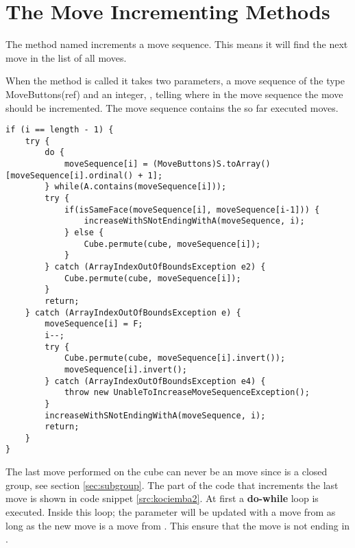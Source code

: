 \section{The Move Incrementing Methods}
\label{sec:increaseWithSNotEndingWithA}
The method named  increments a move sequence. This means it will find the next move in the list of all moves.

When the method is called it takes two parameters, a move sequence of the type MoveButtons(ref) and an integer, , telling where in the move sequence the move should be incremented. The move sequence contains the so far executed moves.





\begin{lstlisting}[style=sourceCode, caption=\myCaption{Key point in the incrementing method of kociemba's optimal solver}, label=src:kociemba2]
if (i == length - 1) {
	try {
		do {
			moveSequence[i] = (MoveButtons)S.toArray()[moveSequence[i].ordinal() + 1];
		} while(A.contains(moveSequence[i]));
		try {
			if(isSameFace(moveSequence[i], moveSequence[i-1])) {
				increaseWithSNotEndingWithA(moveSequence, i);
			} else {
				Cube.permute(cube, moveSequence[i]);
			}
		} catch (ArrayIndexOutOfBoundsException e2) {
			Cube.permute(cube, moveSequence[i]);
		}
		return;
	} catch (ArrayIndexOutOfBoundsException e) {
		moveSequence[i] = F;
		i--;
		try {
			Cube.permute(cube, moveSequence[i].invert());
			moveSequence[i].invert();
		} catch (ArrayIndexOutOfBoundsException e4) {
			throw new UnableToIncreaseMoveSequenceException();
		}
		increaseWithSNotEndingWithA(moveSequence, i);
		return;
	}
}
\end{lstlisting}

The last move performed on the cube can never be an  move since  is a closed group, see section \ref{sec:subgroup}. The part of the code that increments the last move is shown in code snippet \ref{src:kociemba2}.
At first a \textbf{do-while} loop is executed. 
Inside this loop; the parameter  will be updated with a move from  as long as the new move is a move from . This ensure that the move is not ending in .

